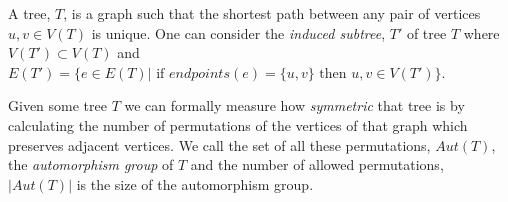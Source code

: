 \documentclass[12pt]{article} %
\theoremstyle{definition}
\begin{document}
A tree, $T$, is a graph such that the shortest path between any pair of vertices $u,v \in V(T)$ is unique. One can consider the \emph{induced subtree}, $T'$ of tree $T$ where $V(T') \subset V(T)$ and $E(T') = \{e \in E(T)  |  \text{ if } endpoints(e) = \{u,v\} \text{ then } u,v \in V(T')\}$.




Given some tree $T$ we can formally measure how \emph{symmetric} that tree is by calculating the number of permutations of the vertices of that graph which preserves adjacent vertices.  We call the set of all these permutations, $Aut(T)$, the \emph{automorphism group} of $T$ and the number of allowed permutations, $|Aut(T)|$ is the size of the automorphism group.  

\end{document}
